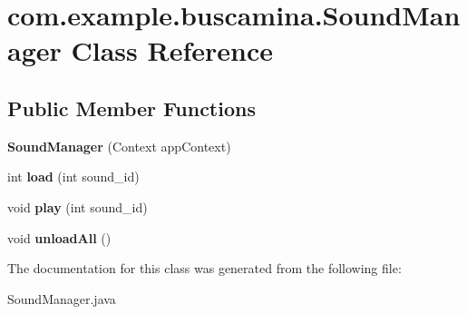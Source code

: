 \section{com.\-example.\-buscamina.\-Sound\-Manager Class Reference}
\label{classcom_1_1example_1_1buscamina_1_1_sound_manager}
\subsection*{Public Member Functions}
\begin{DoxyCompactItemize}
\item 
{\bfseries Sound\-Manager} (Context app\-Context)\label{classcom_1_1example_1_1buscamina_1_1_sound_manager_ac1990d424ebbf8939ee8a424f25a00f0}

\item 
int {\bfseries load} (int sound\-\_\-id)\label{classcom_1_1example_1_1buscamina_1_1_sound_manager_a414fd1528bd79482693d1b8b9cc33299}

\item 
void {\bfseries play} (int sound\-\_\-id)\label{classcom_1_1example_1_1buscamina_1_1_sound_manager_a163de5ab9d19bf5873d779a4cc124a95}

\item 
void {\bfseries unload\-All} ()\label{classcom_1_1example_1_1buscamina_1_1_sound_manager_a8cacb0dd0ca03f035ef37799f5a28a31}

\end{DoxyCompactItemize}


The documentation for this class was generated from the following file\-:\begin{DoxyCompactItemize}
\item 
Sound\-Manager.\-java\end{DoxyCompactItemize}

